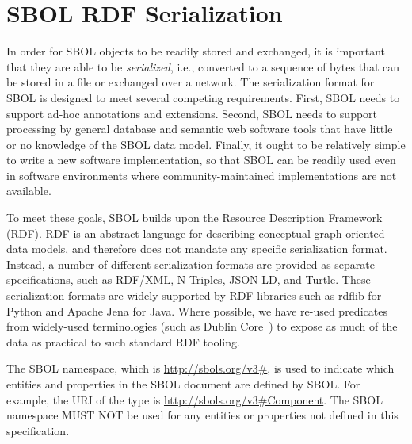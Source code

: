 \section{SBOL RDF Serialization}
\label{sec:serialization}

In order for SBOL objects to be readily stored and exchanged, it is important that they are able to be {\em serialized}, i.e., converted to a sequence of bytes that can be stored in a file or exchanged over a network.  The serialization format for SBOL is designed to meet several competing requirements. 
First, SBOL needs to support ad-hoc annotations and extensions. 
Second, SBOL needs to support processing by general database and semantic web software tools that have little or no knowledge of the SBOL data model. 
Finally, it ought to be relatively simple to write a new software implementation, so that SBOL can be readily used even in software environments where community-maintained implementations are not available.

To meet these goals, SBOL builds upon the Resource Description Framework (RDF).  RDF is an abstract language for describing conceptual graph-oriented data models, and therefore does not mandate any specific serialization format.  Instead, a number of different serialization formats are provided as separate specifications, such as RDF/XML, N-Triples, JSON-LD, and Turtle.  These serialization formats are widely supported by RDF libraries such as rdflib for Python and Apache Jena for Java.  Where possible, we have re-used predicates from widely-used terminologies (such as Dublin Core~\cite{dcmi2012}) to expose as much of the data as practical to such standard RDF tooling.

The SBOL namespace, which is \url{http://sbols.org/v3\#}, is used to indicate which entities and properties in the SBOL document are defined by SBOL. For example, the URI of the type  is \url{http://sbols.org/v3\#Component}. The SBOL namespace MUST NOT be used for any entities or properties not defined in this specification.
